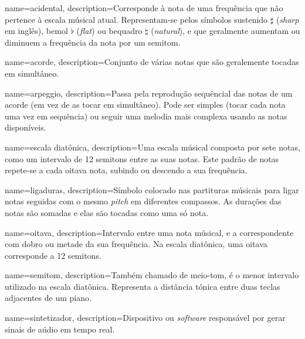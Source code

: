 
 {
	name={acidental}, 
	description={Corresponde à nota de uma frequência que não pertence à escala músical atual. Representam-se pelos símbolos sustenido $\sharp$ (\textit{sharp} em inglês), bemol $\flat$ (\textit{flat}) ou bequadro $\natural$ (\textit{natural}), e que geralmente aumentam ou diminuem a frequência da nota por um semitom.}
}

 {
	name={acorde}, 
	description={Conjunto de várias notas que são geralemente tocadas em simultâneo.}
}

 {
	name={arpeggio}, 
	description={Passa pela reprodução sequêncial das notas de um acorde (em vez de as tocar em simultâneo). Pode ser simples (tocar cada nota uma vez em sequência) ou seguir uma melodia mais complexa usando as notas disponíveis.}
}

 {
	name={escala diatônica}, 
	description={Uma escala músical composta por sete notas, como um intervalo de 12 semitons entre as suas notas. Este padrão de notas repete-se a cada oitava nota, subindo ou descendo a sua frequência.}
}

 {
	name={ligaduras}, 
	description={Símbolo colocado nas partituras músicais para ligar notas seguidas com o mesmo \textit{pitch} em diferentes compassos. As durações das notas são somadas e elas são tocadas como uma só nota.}
}

 {
	name={oitava}, 
	description={Intervalo entre uma nota músical, e a correspondente com  dobro ou metade da sua frequência. Na escala diatônica, uma oitava corresponde a 12 semitons.}
}

 {
	name={semitom}, 
	description={Também chamado de meio-tom, é o menor intervalo utilizado na escala diatônica. Representa a distância tónica entre duas teclas adjacentes de um piano.}
}



 {
	name={sintetizador}, 
	description={Dispositivo ou \textit{software} responsável por gerar sinais de aúdio em tempo real.}
}

\glsaddall
